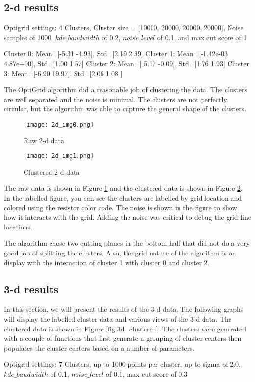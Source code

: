 \subsection{2-d results}
Optigrid settings: 4 Clusters, Cluster size = [10000, 20000, 20000, 20000], Noise samples of 1000, $kde\_bandwidth$ of 0.2, $noise\_level$ of 0.1, and max cut score of 1

\begin{tcolorbox}
\small
Cluster 0: Mean=[-5.31 -4.93], Std=[2.19 2.39]\newline
Cluster 1: Mean=[-1.42e-03  4.87e+00], Std=[1.00 1.57]\newline
Cluster 2: Mean=[ 5.17 -0.09], Std=[1.76  1.93]\newline
Cluster 3: Mean=[-6.90 19.97], Std=[2.06 1.08 ]
\end{tcolorbox}
\normalfont

The OptiGrid algorithm did a reasonable job of clustering the data. 
The clusters are well separated and the noise is minimal. 
The clusters are not perfectly circular, but the algorithm was able to capture the general shape of the clusters.

\begin{figure}[H]
    \centering
    \texttt{[image: 2d\_img0.png]}
    \caption{Raw 2-d data}
    \label{fig:2d_raw}
\end{figure}

\begin{figure}[H]
    \centering
    \texttt{[image: 2d\_img1.png]}
    \caption{Clustered 2-d data}
    \label{fig:2d_clustered}
\end{figure}

The  raw data is shown in Figure \ref{fig:2d_raw} and the clustered data is shown in Figure \ref{fig:2d_clustered}. 
In the labelled figure, you can see the clusters are labelled by grid location and colored using the resistor color code. The noise is shown in the figure to show how it interacts with the grid.
Adding the noise was critical to debug the grid line locations.\par
The algorithm chose two cutting planes in the bottom half that did not do a very good job of splitting the clusters. Also, the grid nature of the algorithm is on display with the interaction of cluster 1 with cluster 0 and cluster 2.
\subsection{3-d results}
In this section, we will present the results of the 3-d data. The following graphs will display the labelled cluster data and various views of the 3-d data.  The clustered data is shown in Figure \ref{fig:3d_clustered}.
The clusters were generated with a couple of functions that first generate a grouping of cluster centers then populates the cluster centers based on a number of parameters.\par
Optigrid settings: 7 Clusters, up to 1000 points per cluster, up to sigma of 2.0, $kde\_bandwidth$ of 0.1, $noise\_level$ of 0.1, max cut score of 0.3

